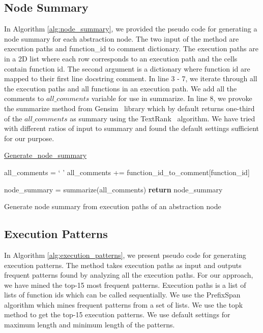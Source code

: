 \subsection{Node Summary}

In Algorithm \ref{alg:node_summary}, we provided the pseudo code for generating a node summary for each abstraction node. The two input of the method are execution paths and function\_id to comment dictionary. The execution paths are in a 2D list where each row corresponds to an execution path and the cells contain function id. The second argument is a dictionary where function id are mapped to their first line docstring comment. In line 3 - 7, we iterate through all the execution paths and all functions in an execution path. We add all the comments to $all\_comments$ variable for use in summarize. In line 8, we provoke the summarize method from Gensim~\cite{gensim} library which by default returns one-third of the $all\_comments$ as summary using the TextRank~\cite{mihalcea2004textrank} algorithm. We have tried with different ratios of input to summary and found the default settings sufficient for our purpose.

\begin{algorithm}

    \underline{Generate\_node\_summary} 
    
    all\_comments = ` '\;
    {
        {
            all\_comments += function\_id\_to\_comment[function\_id]\;
        }
    }
    
    node\_summary = summarize(all\_comments)\; 
    \textbf{return} node\_summary
    \caption{Generate node summary from execution paths of an abstraction node}
    \label{alg:node_summary}
\end{algorithm}

\subsection{Execution Patterns}
In Algorithm \ref{alg:execution_patterns}, we present pseudo code for generating execution patterns. The method takes execution paths as input and outputs frequent patterns found by analyzing all the execution paths. For our approach, we have mined the top-15 most frequent patterns. Execution paths is a list of lists of function ids which can be called sequentially. We use the PrefixSpan algorithm which mines frequent patterns from a set of lists. We use the topk method to get the top-15 execution patterns. We use default settings for maximum length and minimum length of the patterns. 

